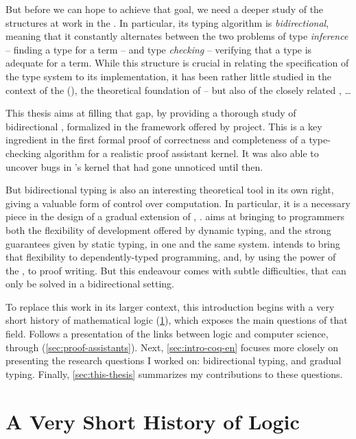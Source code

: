 But before we can hope to achieve that goal, we need a deeper study of the structures at work
in the . In particular, its typing algorithm is \emph{bidirectional}, meaning that
it constantly alternates between the two problems of type \emph{inference} –
finding a type for a term – and type \emph{checking} –
verifying that a type is adequate for a term. While this
structure is crucial in relating the specification of the type system to its implementation,
it has been rather little studied in the context of the
 (),
the theoretical foundation of  – but also of the closely related
, …

This thesis aims at filling that gap, by providing a thorough study of bidirectional ,
formalized in the framework offered by  project. This is a key
ingredient in the first formal proof of correctness and completeness of a type-checking
algorithm for a realistic proof assistant kernel.
It was also able to uncover bugs in ’s kernel that had gone unnoticed until then.

But bidirectional typing is also an interesting theoretical tool in its own right,
giving a valuable form of control over computation.
In particular, it is a necessary piece in the design of a gradual extension of
, .
 aims at bringing to programmers both the flexibility of
development offered by dynamic typing, and the strong guarantees given
by static typing, in one and the same system.  intends
to bring that flexibility to dependently-typed programming,
and, by using the power of the , to proof writing.
But this endeavour comes with subtle difficulties,
that can only be solved in a bidirectional setting.

To replace this work in its larger context, this introduction begins with a very
short history of mathematical logic (\cref{sec:logic-history}), which exposes the
main questions of that field. Follows a presentation of the links between logic and
computer science, through  (\cref{sec:proof-assistants}).
Next, \cref{sec:intro-coq-en} focuses more closely on presenting
the research questions I worked on: bidirectional typing,  and gradual typing.
Finally, \cref{sec:this-thesis} summarizes my contributions to these questions.

\section{A Very Short History of Logic}
\label{sec:logic-history}

